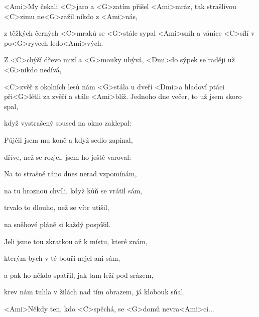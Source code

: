 
\zs
<Ami>My čekali <C>jaro a <G>zatím přišel <Ami>mráz,
tak strašlivou <C>zimu ne<G>zažil nikdo z <Ami>nás,

z těžkých černých <C>mraků se <G>stále sypal <Ami>sníh
a vánice <C>sílí v po<G>ryvech ledo<Ami>vých.

Z <C>chýší dřevo mizí a <G>mouky ubývá,
<Dmi>do sýpek se raději už <G>nikdo nedívá,

<C>zvěř z okolních lesů nám <G>stála u dveří
<Dmi>a hladoví ptáci při<G>létli za zvěří a stále <Ami>blíž.
\ks
\zs
Jednoho dne večer, to už jsem skoro spal,

když vystrašený soused na okno zaklepal:


Půjčil jsem mu koně a když sedlo zapínal,

dříve, než se rozjel, jsem ho ještě varoval:

\ks
\zs
Na to strašné ráno dnes nerad vzpomínám,

na tu hroznou chvíli, když kůň se vrátil sám,

trvalo to dlouho, než se vítr utišil,

na sněhové pláně si každý pospíšil.

Jeli jsme tou zkratkou až k místu, které znám,

kterým bych v té bouři nejel ani sám,

a pak ho někdo spatřil, jak tam leží pod srázem,

krev nám tuhla v žilách nad tím obrazem, já klobouk sňal.
\ks

<Ami>Někdy ten, kdo <C>spěchá, se <G>domů nevra<Ami>cí...
\kp
